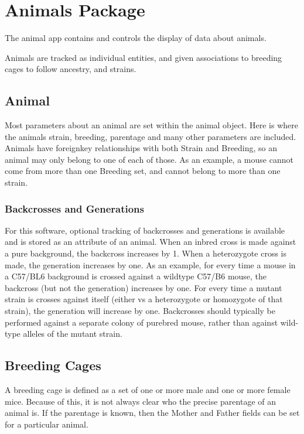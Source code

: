 \documentclass[letterpaper,10pt,english]{sphinxmanual}
\begin{document}
\section{Animals Package}
\label{api:animals-package}\label{api:module-animal}
The animal app contains and controls the display of data about animals.

Animals are tracked as individual entities, and given associations to breeding cages to follow ancestry, and strains.


\subsection{Animal}
\label{api:animal}
Most parameters about an animal are set within the animal object.  Here is where the animals strain, breeding, parentage and many other parameters are included.  Animals have foreignkey relationships with both Strain and Breeding, so an animal may only belong to one of each of those.  As an example, a mouse cannot come from more than one Breeding set, and cannot belong to more than one strain.


\subsubsection{Backcrosses and Generations}
\label{api:backcrosses-and-generations}
For this software, optional tracking of backcrosses and generations is available and is stored as an attribute of an animal.  When an inbred cross is made against a pure background, the backcross increases by 1.  When a heterozygote cross is made, the generation increases by one.  As an example, for every time a mouse in a C57/BL6 background is crossed against a wildtype C57/B6 mouse, the backcross (but not the generation) increases by one.  For every time a mutant strain is crosses against itself (either vs a heterozygote or homozygote of that strain), the generation will increase by one.  Backcrosses should typically be performed against a separate colony of purebred mouse, rather than against wild-type alleles of the mutant strain.


\subsection{Breeding Cages}
\label{api:breeding-cages}
A breeding cage is defined as a set of one or more male and one or more female mice.  Because of this, it is not always clear who the precise parentage of an animal is.  If the parentage is known, then the Mother and Father fields can be set for a particular animal.
\end{document}
